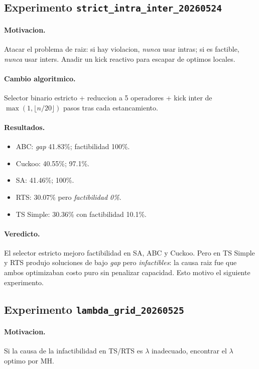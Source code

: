 \documentclass[11pt,a4paper]{article}
\newcommand{\mh}{MH}
\begin{document}
\subsection{Experimento \texttt{strict\_intra\_inter\_20260524}}

\paragraph{Motivacion.} Atacar el problema de raiz: si hay violacion,
\emph{nunca} usar intras; si es factible, \emph{nunca} usar inters.
Anadir un kick reactivo para escapar de optimos locales.

\paragraph{Cambio algoritmico.} Selector binario estricto + reduccion
a 5 operadores + kick inter de $\max(1, \lfloor n/20\rfloor)$ pasos
tras cada estancamiento.

\paragraph{Resultados.}
\begin{itemize}
\item ABC: \emph{gap} 41.83\%; factibilidad 100\%.
\item Cuckoo: 40.55\%; 97.1\%.
\item SA: 41.46\%; 100\%.
\item RTS: 30.07\% pero \emph{factibilidad 0\%}.
\item TS Simple: 30.36\% con factibilidad 10.1\%.
\end{itemize}

\paragraph{Veredicto.} El selector estricto mejoro factibilidad en SA,
ABC y Cuckoo. Pero en TS Simple y RTS produjo soluciones de bajo
\emph{gap} pero \emph{infactibles}: la causa raiz fue que ambos
optimizaban costo puro sin penalizar capacidad. Esto motivo el
siguiente experimento.

\subsection{Experimento \texttt{lambda\_grid\_20260525}}

\paragraph{Motivacion.} Si la causa de la infactibilidad en TS/RTS es
$\lambda$ inadecuado, encontrar el $\lambda$ optimo por \mh.
\end{document}
